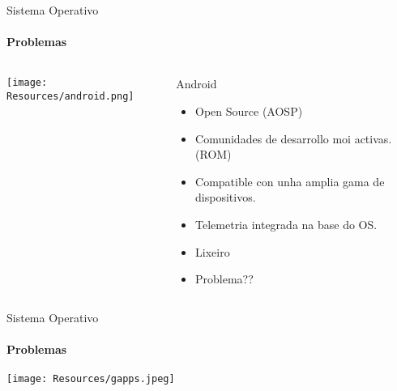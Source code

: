 \documentclass{beamer}
\begin{document}
\begin{frame}{Sistema Operativo}
  \framesubtitle{Problemas}

  \begin{columns}
    \begin{column}{0.5\textwidth}
      \texttt{[image: Resources/android.png]}

    \end{column}

    \begin{column}{0.4\textwidth}
      \begin{block}{Android}
        \begin{itemize}
          \item Open Source (AOSP)
          \item Comunidades de desarrollo moi activas. (ROM)
          \item Compatible con unha amplia gama de dispositivos.
          \item Telemetria integrada na base do OS.
          \item Lixeiro
          \item Problema??
        \end{itemize}
      \end{block}

    \end{column}

  \end{columns}

\end{frame}



\begin{frame}{Sistema Operativo}
  \framesubtitle{Problemas}

  \texttt{[image: Resources/gapps.jpeg]}

\end{frame}
\end{document}
